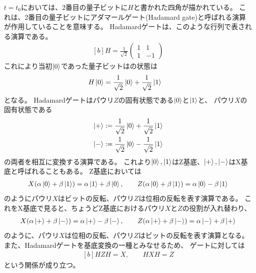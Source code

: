 \documentclass[../master.tex]{subfiles}
\begin{document}
\(t=t_0\)においては、2番目の量子ビットに\(H\)と書かれた四角が描かれている。
これは、2番目の量子ビットにアダマールゲート(Hadamard gate)と呼ばれる演算が作用していることを意味する。
Hadamardゲートは、このような行列で表される演算である。
\begin{equation}\begin{aligned}[b]
    H = \frac{1}{\sqrt{2}}\begin{pmatrix}
        1 & 1\\
        1 & -1
    \end{pmatrix}
\end{aligned}\end{equation}
これにより当初\(\ket{0}\)であった量子ビットはの状態は
\begin{equation}\begin{aligned}[b]
    H\ket{0} &= \frac{1}{\sqrt{2}}\ket{0}+\frac{1}{\sqrt{2}}\ket{1}
\end{aligned}\end{equation}
となる。
Hadamardゲートはパウリ\(Z\)の固有状態である\(\ket{0}\)と\(\ket{1}\)と、
パウリ\(X\)の固有状態である
\begin{equation}\begin{aligned}[b]
    \ket{+}&:=\frac{1}{\sqrt{2}}\ket{0}+\frac{1}{\sqrt{2}}\ket{1}\\
    \ket{-}&:=\frac{1}{\sqrt{2}}\ket{0}-\frac{1}{\sqrt{2}}\ket{1}
\end{aligned}\end{equation}
の両者を相互に変換する演算である。
これより\(\ket{0},\ket{1}\)はZ基底、\(\ket{+},\ket{-}\)はX基底と呼ばれることもある。
Z基底においては
\begin{equation}\begin{aligned}[b]
    X(\alpha\ket{0}+\beta\ket{1})=\alpha\ket{1}+\beta\ket{0},\qquad
    Z(\alpha\ket{0}+\beta\ket{1})=\alpha\ket{0}-\beta\ket{1}
\end{aligned}\end{equation}
のようにパウリ\(X\)はビットの反転、パウリ\(Z\)は位相の反転を表す演算である。
これをX基底で見ると、ちょうどZ基底におけるパウリ\(X\)と\(Z\)の役割が入れ替わり、
\begin{equation}\begin{aligned}[b]
    X(\alpha\ket{+}+\beta\ket{-})=\alpha\ket{+}-\beta\ket{-},\qquad
    Z(\alpha\ket{+}+\beta\ket{-})=\alpha\ket{-}+\beta\ket{+}
\end{aligned}\end{equation}
のように、パウリ\(X\)は位相の反転、パウリ\(Z\)はビットの反転を表す演算となる。
また、Hadamardゲートを基底変換の一種とみなせるため、
ゲートに対しては
\begin{equation}\begin{aligned}[b]
    HZH = X, \qquad
    HXH = Z
\end{aligned}\end{equation}
という関係が成り立つ。
\end{document}
